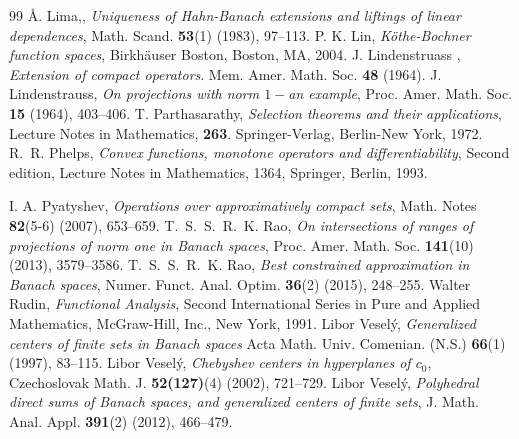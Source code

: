 \documentclass[11pt]{amsart}
\begin{document}
\begin{thebibliography}{99}
\AA. Lima,, {\em Uniqueness of Hahn-Banach extensions and liftings of linear dependences}, Math. Scand. {\bf 53}(1) (1983),  97--113.
 P. K. Lin, {\it K\"othe-Bochner function spaces}, Birkh\"auser Boston, Boston, MA, 2004.
 J. Lindenstruass , {\em Extension of compact operators}. Mem. Amer. Math. Soc. {\bf 48} (1964).
J. Lindenstrauss, {\em On projections with norm $1-$an example}, Proc. Amer. Math. Soc. {\bf 15} (1964), 403--406.
 T. Parthasarathy, {\em Selection theorems and their applications}, Lecture Notes in Mathematics, {\bf 263}. Springer-Verlag, Berlin-New York, 1972.
 R.~R. Phelps, {\em Convex functions, monotone operators and differentiability}, Second edition, 
Lecture Notes in Mathematics, 1364, Springer, Berlin, 1993.

 I. A. Pyatyshev, {\em Operations over approximatively compact sets}, Math. Notes {\bf 82}(5-6) (2007), 653--659.
T.~S.~S.~R.~K. Rao, {\em On intersections of ranges of projections of norm one in Banach spaces}, Proc. Amer. Math. Soc. {\bf 141}(10) (2013), 3579--3586.
T.~S.~S.~R.~K. Rao, {\em Best constrained approximation in Banach spaces}, Numer. Funct. Anal. Optim. {\bf 36}(2) (2015),  248--255.
 Walter Rudin, {\em Functional Analysis}, Second International Series in Pure and Applied Mathematics, McGraw-Hill, Inc., New York, 1991.
 Libor Vesel\'{y}, {\em Generalized centers of finite sets in Banach spaces} Acta Math. Univ. Comenian. (N.S.) {\bf 66}(1) (1997), 83--115.
 Libor Vesel\'y, {\em Chebyshev centers in hyperplanes of $c_0$}, Czechoslovak Math. J. {\bf 52(127)}(4) (2002), 721--729.
Libor Vesel\'y, {\em Polyhedral direct sums of Banach spaces, and generalized centers of finite sets}, J. Math. Anal. Appl. {\bf 391}(2) (2012), 466--479.
\end{thebibliography}
\Addresses
\end{document}

